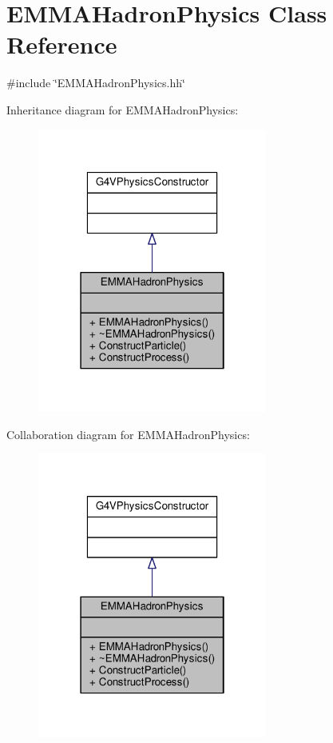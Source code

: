 \hypertarget{classEMMAHadronPhysics}{}\section{E\+M\+M\+A\+Hadron\+Physics Class Reference}
\label{classEMMAHadronPhysics}


{\ttfamily \#include \char`\"{}E\+M\+M\+A\+Hadron\+Physics.\+hh\char`\"{}}



Inheritance diagram for E\+M\+M\+A\+Hadron\+Physics\+:
\nopagebreak
\begin{figure}[H]
\begin{center}
\leavevmode
\includegraphics[width=214pt]{classEMMAHadronPhysics__inherit__graph}
\end{center}
\end{figure}


Collaboration diagram for E\+M\+M\+A\+Hadron\+Physics\+:
\nopagebreak
\begin{figure}[H]
\begin{center}
\leavevmode
\includegraphics[width=214pt]{classEMMAHadronPhysics__coll__graph}
\end{center}
\end{figure}
